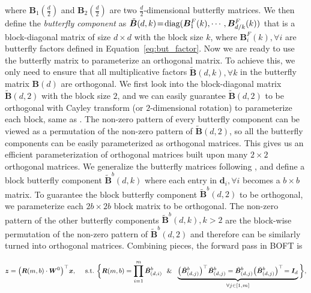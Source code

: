 \documentclass{article} %
\begin{document}
where $\bm{B}_1(\frac{d}{2})$ and $\bm{B}_2(\frac{d}{2})$ are two $\frac{d}{2}$-dimensional butterfly matrices. We then define the \emph{butterfly component} as $\thickmuskip=2mu \medmuskip=2mu \tilde{\bm{B}}(d,k)=\text{diag}(\bm{B}^F_1(k),\cdots,\bm{B}^F_{d/k}(k))$ that is a block-diagonal matrix of size $d\times d$ with the block size $k$, where $\bm{B}^F_i(k),\forall i$ are butterfly factors defined in Equation~\ref{eq:but_factor}. Now we are ready to use the butterfly matrix to parameterize an orthogonal matrix. To achieve this, we only need to ensure that all multiplicative factors $\tilde{\bm{B}}(d,k),\forall k$ in the butterfly matrix $\bm{B}(d)$ are orthogonal. We first look into the block-diagonal matrix $\tilde{\bm{B}}(d,2)$ with the block size $2$, and we can easily guarantee $\tilde{\bm{B}}(d,2)$ to be orthogonal with Cayley transform (or $2$-dimensional rotation) to parameterize each block, same as \cite{liu2021orthogonal,qiu2023controlling}. The non-zero pattern of every butterfly component can be viewed as a permutation of the non-zero pattern of $\tilde{\bm{B}}(d,2)$, so all the butterfly components can be easily parameterized as orthogonal matrices. This gives us an efficient parameterization of orthogonal matrices built upon many $2\times 2$ orthogonal matrices. We generalize the butterfly matrices following \cite{chen2022pixelated}, and define a block butterfly component $\tilde{\bm{B}}^b(d,k)$ where each entry in $\bm{d}_i,\forall i$ becomes a $b\times b$ matrix. To guarantee the block butterfly component $\tilde{\bm{B}}^b(d,2)$ to be orthogonal, we parameterize each $2b\times 2b$ block matrix to be orthogonal. The non-zero pattern of the other butterfly components $\tilde{\bm{B}}^b(d,k),k>2$ are the block-wise permutation of the non-zero pattern of $\tilde{\bm{B}}^b(d,2)$ and therefore can be similarly turned into orthogonal matrices. Combining pieces, the forward pass in BOFT is

\vspace{-5.5mm}
\begin{equation}
    \footnotesize
    \begin{aligned}\nonumber
    \bm{z}=\big(\bm{R}(m,b)\cdot\bm{W}^0\big)^\top\bm{x},~~~~\text{s.t.}~\bigg{\{}\bm{R}(m,b)=\prod_{i=1}^m \tilde{\bm{B}}^b_{(d,i)}~~\&~~\underbrace{\big(\tilde{\bm{B}}^b_{(d,j)}\big)^\top\tilde{\bm{B}}^b_{(d,j)}=\tilde{\bm{B}}^b_{(d,j)}\big(\tilde{\bm{B}}^b_{(d,j)}\big)^\top\!=\bm{I}_d}_{\forall j\in [1, m]}\bigg{\}},
    \end{aligned}
\end{equation}
\vspace{-4mm}
\end{document}
